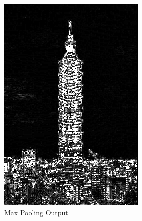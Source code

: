 \documentclass[12pt,a4paper]{report}
\begin{document}
\begin{figure}[!htb]
\begin{minipage}{0.49\textwidth}
    \includegraphics[width=0.9\linewidth]{result_img/taipei101_Q3.png}
    \caption{Max Pooling Output}\label{Fig:Data4}
  \end{minipage}
  \end{figure}
\end{document}
